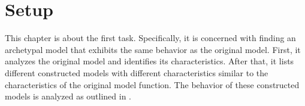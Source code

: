 \chapter{Setup}
\label{chap:setup}

This chapter is about the first task.
Specifically, it is concerned with finding an archetypal model that exhibits the same behavior as the original model.
First, it analyzes the original model and identifies its characteristics.
After that, it lists different constructed models with different characteristics similar to the characteristics of the original model function.
The behavior of these constructed models is analyzed as outlined in .






